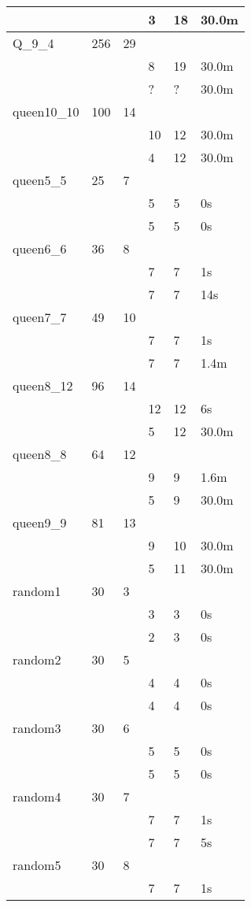 \begin{table}[]
\begin{tabular}{|lll|l|l|l|}
\cline{4-6}
&&&3  &18 &30.0m\\
\cline{4-6}
\hline
Q\_9\_4&256&29&&&\\
&&&8  &19 &30.0m\\
\cline{4-6}
&&&?  &? &30.0m\\
\cline{4-6}
\hline
queen10\_10&100&14&&&\\
&&&10  &12 &30.0m\\
\cline{4-6}
&&&4  &12 &30.0m\\
\cline{4-6}
\hline
queen5\_5&25&7&&&\\
&&&5  &5 &0s\\
\cline{4-6}
&&&5  &5 &0s\\
\cline{4-6}
\hline
queen6\_6&36&8&&&\\
&&&7  &7 &1s\\
\cline{4-6}
&&&7  &7 &14s\\
\cline{4-6}
\hline
queen7\_7&49&10&&&\\
&&&7  &7 &1s\\
\cline{4-6}
&&&7  &7 &1.4m\\
\cline{4-6}
\hline
queen8\_12&96&14&&&\\
&&&12  &12 &6s\\
\cline{4-6}
&&&5  &12 &30.0m\\
\cline{4-6}
\hline
queen8\_8&64&12&&&\\
&&&9  &9 &1.6m\\
\cline{4-6}
&&&5  &9 &30.0m\\
\cline{4-6}
\hline
queen9\_9&81&13&&&\\
&&&9  &10 &30.0m\\
\cline{4-6}
&&&5  &11 &30.0m\\
\cline{4-6}
\hline
random1&30&3&&&\\
&&&3  &3 &0s\\
\cline{4-6}
&&&2  &3 &0s\\
\cline{4-6}
\hline
random2&30&5&&&\\
&&&4  &4 &0s\\
\cline{4-6}
&&&4  &4 &0s\\
\cline{4-6}
\hline
random3&30&6&&&\\
&&&5  &5 &0s\\
\cline{4-6}
&&&5  &5 &0s\\
\cline{4-6}
\hline
random4&30&7&&&\\
&&&7  &7 &1s\\
\cline{4-6}
&&&7  &7 &5s\\
\cline{4-6}
\hline
random5&30&8&&&\\
&&&7  &7 &1s\\

\end{tabular}
\end{table}
